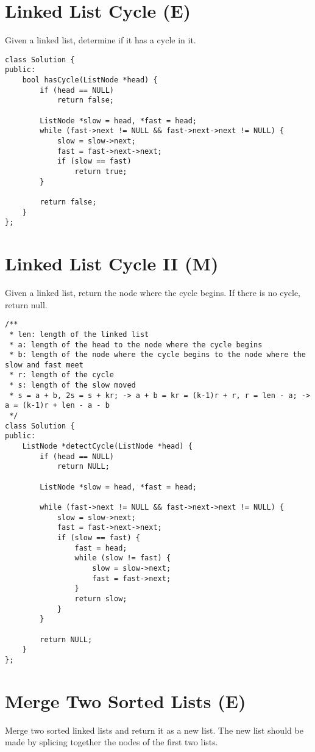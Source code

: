 \section{Linked List Cycle (E)}
Given a linked list, determine if it has a cycle in it. \\

\begin{lstlisting}
class Solution {
public:
    bool hasCycle(ListNode *head) {
        if (head == NULL)
            return false;
            
        ListNode *slow = head, *fast = head;
        while (fast->next != NULL && fast->next->next != NULL) {
            slow = slow->next;
            fast = fast->next->next;
            if (slow == fast)
                return true;
        }
        
        return false;
    }
};
\end{lstlisting}


\section{Linked List Cycle II (M)}
Given a linked list, return the node where the cycle begins. If there is no cycle, return null. \\
 
\begin{lstlisting}
/** 
 * len: length of the linked list
 * a: length of the head to the node where the cycle begins
 * b: length of the node where the cycle begins to the node where the slow and fast meet
 * r: length of the cycle
 * s: length of the slow moved
 * s = a + b, 2s = s + kr; -> a + b = kr = (k-1)r + r, r = len - a; -> a = (k-1)r + len - a - b
 */
class Solution {
public:
    ListNode *detectCycle(ListNode *head) {
        if (head == NULL)
            return NULL;

        ListNode *slow = head, *fast = head;
        
        while (fast->next != NULL && fast->next->next != NULL) {
            slow = slow->next;
            fast = fast->next->next;
            if (slow == fast) {
                fast = head;
                while (slow != fast) {
                    slow = slow->next;
                    fast = fast->next;
                }
                return slow;
            }
        }
        
        return NULL;
    }
};
\end{lstlisting}


\section{Merge Two Sorted Lists (E)}
Merge two sorted linked lists and return it as a new list. The new list should be made by splicing together the nodes of the first two lists.\\

